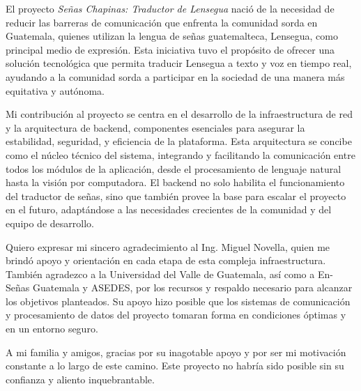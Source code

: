 El proyecto \textit{Señas Chapinas: Traductor de Lensegua} nació de la necesidad de reducir las barreras de comunicación que enfrenta la comunidad sorda en Guatemala, quienes utilizan la lengua de señas guatemalteca, Lensegua, como principal medio de expresión. Esta iniciativa tuvo el propósito de ofrecer una solución tecnológica que permita traducir Lensegua a texto y voz en tiempo real, ayudando a la comunidad sorda a participar en la sociedad de una manera más equitativa y autónoma.

Mi contribución al proyecto se centra en el desarrollo de la infraestructura de red y la arquitectura de backend, componentes esenciales para asegurar la estabilidad, seguridad, y eficiencia de la plataforma. Esta arquitectura se concibe como el núcleo técnico del sistema, integrando y facilitando la comunicación entre todos los módulos de la aplicación, desde el procesamiento de lenguaje natural hasta la visión por computadora. El backend no solo habilita el funcionamiento del traductor de señas, sino que también provee la base para escalar el proyecto en el futuro, adaptándose a las necesidades crecientes de la comunidad y del equipo de desarrollo.

Quiero expresar mi sincero agradecimiento al Ing. Miguel Novella, quien me brindó apoyo y orientación en cada etapa de esta compleja infraestructura. También agradezco a la Universidad del Valle de Guatemala, así como a En-Señas Guatemala y ASEDES, por los recursos y respaldo necesario para alcanzar los objetivos planteados. Su apoyo hizo posible que los sistemas de comunicación y procesamiento de datos del proyecto tomaran forma en condiciones óptimas y en un entorno seguro.

A mi familia y amigos, gracias por su inagotable apoyo y por ser mi motivación constante a lo largo de este camino. Este proyecto no habría sido posible sin su confianza y aliento inquebrantable.